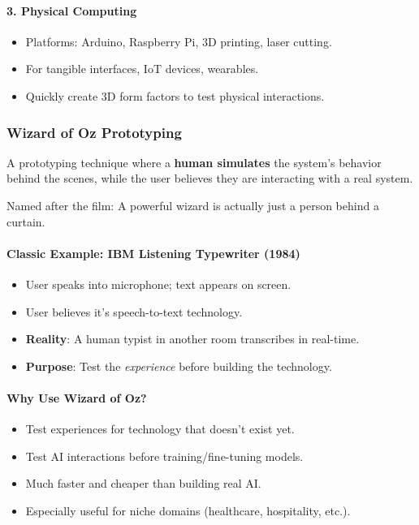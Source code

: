\paragraph*{3. Physical Computing}
\begin{itemize}
  \item Platforms: Arduino, Raspberry Pi, 3D printing, laser cutting.
  \item For tangible interfaces, IoT devices, wearables.
  \item Quickly create 3D form factors to test physical interactions.
\end{itemize}

\subsubsection*{Wizard of Oz Prototyping}

\begin{defbox}[Wizard of Oz]
A prototyping technique where a \textbf{human simulates} the system's behavior behind the scenes, while the user believes they are interacting with a real system.

Named after the film: A powerful wizard is actually just a person behind a curtain.
\end{defbox}

\paragraph*{Classic Example: IBM Listening Typewriter (1984)}
\begin{itemize}
  \item User speaks into microphone; text appears on screen.
  \item User believes it's speech-to-text technology.
  \item \textbf{Reality}: A human typist in another room transcribes in real-time.
  \item \textbf{Purpose}: Test the \textit{experience} before building the technology.
\end{itemize}

\paragraph*{Why Use Wizard of Oz?}
\begin{itemize}
  \item Test experiences for technology that doesn't exist yet.
  \item Test AI interactions before training/fine-tuning models.
  \item Much faster and cheaper than building real AI.
  \item Especially useful for niche domains (healthcare, hospitality, etc.).
\end{itemize}

